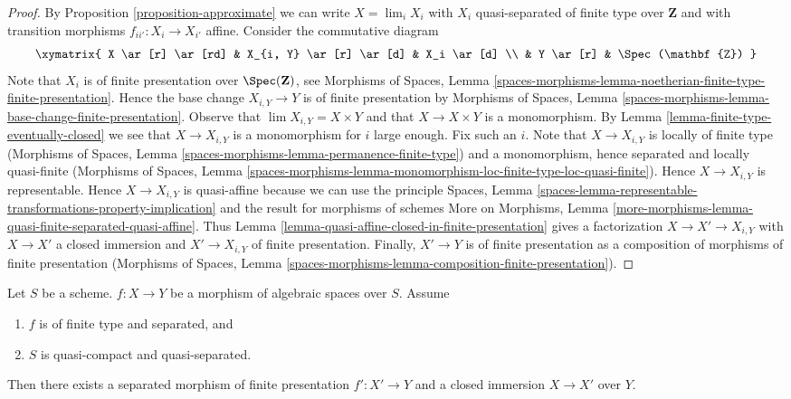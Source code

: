 \begin{proof}
By Proposition \ref{proposition-approximate}
we can write $X = \lim_i X_i$ with $X_i$ quasi-separated of finite type over
$\mathbf{Z}$ and with transition morphisms $f_{ii'} : X_i \to X_{i'}$ affine.
Consider the commutative diagram
$$
\xymatrix{
X \ar[r] \ar[rd] & X_{i, Y} \ar[r] \ar[d] & X_i \ar[d] \\
& Y \ar[r] & \Spec(\mathbf{Z})
}
$$
Note that $X_i$ is of finite presentation over $\Spec(\mathbf{Z})$, see
Morphisms of Spaces, Lemma
\ref{spaces-morphisms-lemma-noetherian-finite-type-finite-presentation}.
Hence the base change $X_{i, Y} \to Y$ is of finite presentation by
Morphisms of Spaces, Lemma
\ref{spaces-morphisms-lemma-base-change-finite-presentation}.
Observe that $\lim X_{i, Y} = X \times Y$ and that $X \to X \times Y$ is a
monomorphism. By Lemma \ref{lemma-finite-type-eventually-closed}
we see that $X \to X_{i, Y}$ is a monomorphism for $i$ large enough.
Fix such an $i$. Note that $X \to X_{i, Y}$ is locally of finite type
(Morphisms of Spaces, Lemma
\ref{spaces-morphisms-lemma-permanence-finite-type})
and a monomorphism, hence separated and locally quasi-finite
(Morphisms of Spaces, Lemma
\ref{spaces-morphisms-lemma-monomorphism-loc-finite-type-loc-quasi-finite}).
Hence $X \to X_{i, Y}$ is representable.
Hence $X \to X_{i, Y}$ is quasi-affine because we can use the
principle Spaces, Lemma
\ref{spaces-lemma-representable-transformations-property-implication}
and the result for morphisms of schemes More on Morphisms, Lemma
\ref{more-morphisms-lemma-quasi-finite-separated-quasi-affine}.
Thus Lemma \ref{lemma-quasi-affine-closed-in-finite-presentation}
gives a factorization $X \to X' \to X_{i, Y}$
with $X \to X'$ a closed immersion and $X' \to X_{i, Y}$ of finite
presentation. Finally, $X' \to Y$ is of finite presentation as a
composition of morphisms of finite presentation
(Morphisms of Spaces, Lemma
\ref{spaces-morphisms-lemma-composition-finite-presentation}).
\end{proof}

\begin{proposition}
\label{proposition-separated-closed-in-finite-presentation}
Let $S$ be a scheme. $f : X \to Y$ be a morphism of algebraic spaces
over $S$. Assume
\begin{enumerate}
\item $f$ is of finite type and separated, and
\item $S$ is quasi-compact and quasi-separated.
\end{enumerate}
Then there exists a separated morphism of finite presentation
$f' : X' \to Y$ and a closed immersion $X \to X'$ over $Y$.
\end{proposition}

